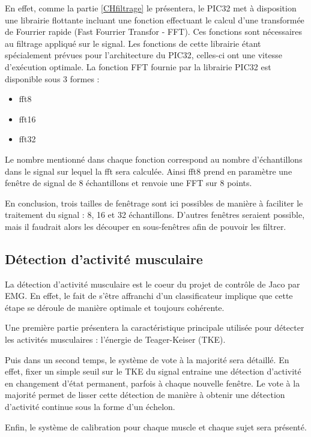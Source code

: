 \documentclass[letterpaper, twoside, 12pt, memoire, creativecommons, hyperref]{thETS}
\begin{document}
En effet, comme la partie \ref{CHfiltrage} le présentera, le PIC32 met à disposition une librairie flottante incluant une fonction effectuant le calcul d'une transformée de Fourrier rapide (Fast Fourrier Transfor - FFT). Ces fonctions sont nécessaires au filtrage appliqué sur le signal. Les fonctions de cette librairie étant spécialement prévues pour l'architecture du PIC32, celles-ci ont une vitesse d'exécution optimale. La fonction FFT fournie par la librairie PIC32 est disponible sous 3 formes : 

\begin{itemize}
 \item fft8
 \item fft16
 \item fft32
\end{itemize}

Le nombre mentionné dans chaque fonction correspond au nombre d'échantillons dans le signal sur lequel la fft sera calculée. Ainsi fft8 prend en paramètre une fenêtre de signal de 8 échantillons et renvoie une FFT sur 8 points.

En conclusion, trois tailles de fenêtrage sont ici possibles de manière à faciliter le traitement du signal : 8, 16 et 32 échantillons. D'autres fenêtres seraient possible, mais il faudrait alors les découper en sous-fenêtres afin de pouvoir les filtrer. 

\subsection{Détection d'activité musculaire}\label{CHdetect}

La détection d'activité musculaire est le coeur du projet de contrôle de Jaco par EMG. En effet, le fait de s'être affranchi d'un classificateur implique que cette étape se déroule de manière optimale et toujours cohérente.

Une première partie présentera la caractéristique principale utilisée pour détecter les activités musculaires : l'énergie de Teager-Keiser (TKE). 

Puis dans un second temps, le système de vote à la majorité sera détaillé. En effet, fixer un simple seuil sur le TKE du signal entraine une détection d'activité en changement d'état permanent, parfois à chaque nouvelle fenêtre. Le vote à la majorité permet de lisser cette détection de manière à obtenir une détection d'activité continue sous la forme d'un échelon.

Enfin, le système de calibration pour chaque muscle et chaque sujet sera présenté.
\end{document}
